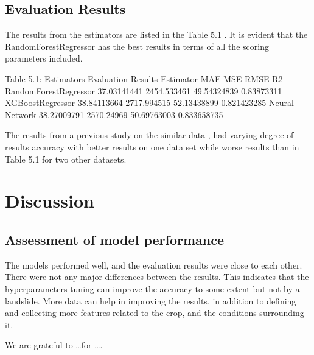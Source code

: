 \documentclass[sigconf, nonacm, natbib, screen, balance=False]{acmart}
\begin{document}
\subsection{Evaluation Results}\label{sec:aspect1}

The results from the estimators are listed in the Table 5.1
. It is evident that the RandomForestRegressor has the best results in terms of all the scoring parameters included.

Table 5.1: Estimators Evaluation Results
Estimator	MAE	MSE	RMSE	R2
RandomForestRegressor	37.03141441	2454.533461	49.54324839	0.83873311
XGBoostRegressor	38.84113664	2717.994515	52.13438899	0.821423285
Neural Network	38.27009791	2570.24969	50.69763003	0.833658735

The results from a previous study on the similar data \cite{lied}, had varying degree of results accuracy with better results on one data set while worse results than in Table 5.1 for two other datasets.


\section{Discussion}\label{sec:aspect1}

\subsection{Assessment of model performance}\label{sec:aspect1}

The models performed well, and the evaluation results were close to each other. There were not any major differences between the results. This indicates that the hyperparameters tuning can improve the accuracy to some extent but not by a landslide. More data can help in improving the results, in addition to defining and collecting more features related to the crop, and the conditions surrounding it.

\begin{acks}
We are grateful to \dots for \dots.
\end{acks}




\end{document}
